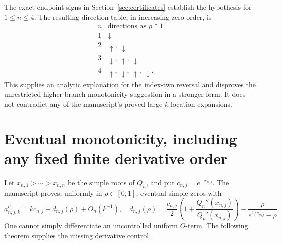 \documentclass[11pt,letterpaper]{article}
\numberwithin{equation}{section}
\theoremstyle{definition}\newtheorem{definition}[theorem]{Definition}
\theoremstyle{remark}\newtheorem{remark}[theorem]{Remark}
\begin{document}
The exact endpoint signs in Section~\ref{sec:certificates} establish the hypothesis for $1\le n\le4$. The resulting direction table, in increasing zero order, is
\[
\begin{array}{c|c}
 n&\text{directions as }\rho\uparrow1\\\hline
 1&\downarrow\\
 2&\uparrow,\ \downarrow\\
 3&\downarrow,\ \uparrow,\ \downarrow\\
 4&\uparrow,\ \downarrow,\ \uparrow,\ \downarrow.
\end{array}
\]
This supplies an analytic explanation for the index-two reversal and disproves the unrestricted higher-branch monotonicity suggestion in a stronger form. It does not contradict any of the manuscript's proved large-$k$ location expansions.

\section{Eventual monotonicity, including any fixed finite derivative order}\label{sec:eventual}
Let $x_{n,1}>\cdots>x_{n,n}$ be the simple roots of $Q_n$, and put
$c_{n,j}=e^{-x_{n,j}}$. The manuscript proves, uniformly in $\rho\in[0,1]$, eventual simple zeros with
\begin{equation}\label{eq:existing-offset}
 a_{n,j,k}^{\rho}=kc_{n,j}+d_{n,j}(\rho)+O_n(k^{-1}),
\quad
 d_{n,j}(\rho)=\frac{c_{n,j}}2
 \left(1+\frac{Q_n''(x_{n,j})}{Q_n'(x_{n,j})}\right)
 -\frac{\rho}{e^{1/c_{n,j}}-\rho}.
\end{equation}
One cannot simply differentiate an uncontrolled uniform $O$-term. The following theorem supplies the missing derivative control.
\end{document}
